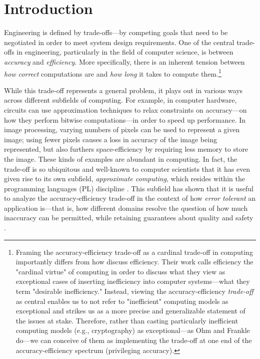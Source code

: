 \documentclass[sigplan,screen]{acmart}
\begin{document}
\section{Introduction} \label{sec:intro}
Engineering is defined by trade-offs---by competing goals that need to be negotiated in order to meet system design requirements. One of the central trade-offs in engineering, particularly in the field of computer science, is between \emph{accuracy} and \emph{efficiency}. More specifically, there is an inherent tension between \emph{how correct} computations are and \emph{how long} it takes to compute them.\footnote{Framing the accuracy-efficiency trade-off as a cardinal trade-off in computing importantly differs from how \citet{ohm70inefficiency} discuss efficiency. Their work calls efficiency the "cardinal virtue" of computing in order to discuss what they view as exceptional cases of inserting inefficiency into computer systems---what they term "desirable inefficiency." Instead, viewing the accuracy-efficiency \emph{trade-off} as central enables us to not refer to "inefficient" computing models as exceptional and strikes us as a more precise and generalizable statement of the issues at stake. Therefore, rather than casting particularly inefficient computing models (e.g., cryptography) as exceptional---as Ohm and Frankle do---we can conceive of them as implementing the trade-off at one end of the accuracy-efficiency spectrum (privileging accuracy).}

While this trade-off represents a general problem, it plays out in various ways across different subfields of computing. For example, in computer hardware, circuits can use approximation techniques to relax constraints on accuracy---on how they perform bitwise computations---in order to speed up performance. In image processing, varying numbers of pixels can be used to represent a given image; using fewer pixels causes a loss in accuracy of the image being represented, but also furthers space-efficiency by requiring less memory to store the image. These kinds of examples are abundant in computing. In fact, the trade-off is so ubiquitous and well-known to computer scientists that  it has even given rise to its own subfield, \emph{approximate computing}, which resides within the programming languages (PL) discipline \cite{moreau2018taxonomy, mittal2016apsurvey}. This subfield has shown that it is useful to analyze the accuracy-efficiency trade-off in the context of how \emph{error tolerant} an application is---that is, how different domains resolve the question of how much inaccuracy can be permitted, while retaining guarantees about quality and safety \cite{sampson2015thesis}.
\end{document}
